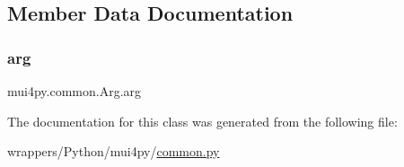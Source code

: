 \subsection{Member Data Documentation}
\mbox{\label{classmui4py_1_1common_1_1_arg_a45ebd7fb8f9080eb469557f4e77e6f0c}} 
\subsubsection{\texorpdfstring{arg}{arg}}
{\footnotesize\ttfamily mui4py.\+common.\+Arg.\+arg}



The documentation for this class was generated from the following file\+:\begin{DoxyCompactItemize}
\item 
wrappers/\+Python/mui4py/\hyperlink{common_8py}{common.\+py}\end{DoxyCompactItemize}
